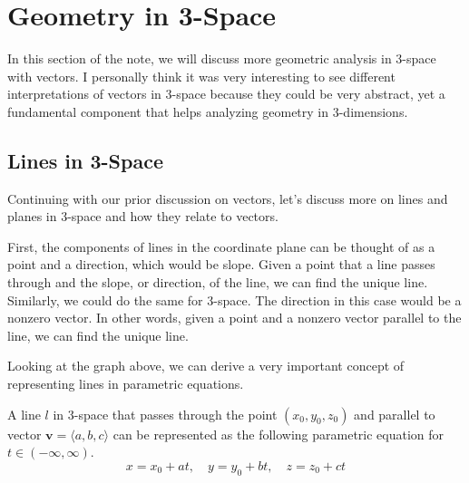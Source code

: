 \documentclass[../../../main.tex]{subfiles}
\begin{document}
\section{Geometry in 3-Space}

In this section of the note, we will discuss more geometric
analysis in 3-space with vectors. I personally think it was
very interesting to see different interpretations of vectors
in 3-space because they could be very abstract, yet a fundamental
component that helps analyzing geometry in 3-dimensions.

\subsection{Lines in 3-Space}

Continuing with our prior discussion on vectors, let's discuss
more on lines and planes in 3-space and how they relate to vectors.

First, the components of lines in the coordinate plane can be thought
of as a point and a direction, which would be slope. Given a point
that a line passes through and the slope, or direction, of the line,
we can find the unique line. Similarly, we could do the same for
3-space. The direction in this case would be a nonzero vector.
In other words, given a point and a nonzero vector parallel to
the line, we can find the unique line.

\begin{figure}[H]
\centering
{}
\end{figure}

Looking at the graph above, we can derive a very important
concept of representing lines in parametric equations.

\begin{important}
A line $l$ in 3-space that passes through the point $(x_0, y_0, z_0)$
and parallel to vector $\mathbf{v} = \langle a, b, c \rangle$ can be
represented as the following parametric equation for
$t \in (-\infty, \infty)$.
\[
x = x_0 + at, \quad
y = y_0 + bt, \quad
z = z_0 + ct
\]
\end{important}
\end{document}
